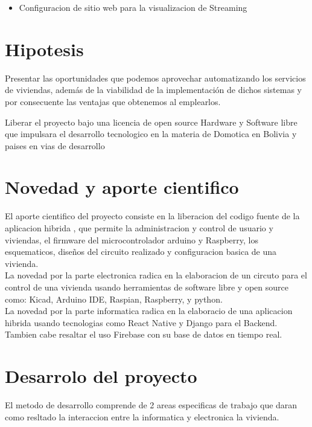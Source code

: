 \documentclass[letterpaper,12pt]{article}
\begin{document}
{\begin{itemize}
	
	\item Configuracion de sitio web para la visualizacion de Streaming 

\end{itemize}




\section{Hipotesis}

Presentar las oportunidades que podemos aprovechar automatizando los servicios de viviendas, además de la viabilidad de la implementación de dichos sistemas y por consecuente las ventajas que obtenemos al emplearlos.

Liberar el proyecto bajo una licencia de open source Hardware y Software libre que impulsara el desarrollo tecnologico en la materia de Domotica en Bolivia y paises en vias de desarrollo

\section{Novedad y aporte cientifico}

El aporte cientifico del proyecto consiste en la liberacion del codigo fuente de la aplicacion hibrida , que permite la administracion y control de usuario y viviendas,  el firmware del microcontrolador  arduino y Raspberry, los esquematicos, diseños del circuito realizado y configuracion basica de una vivienda.\\

La novedad por la parte electronica radica en la elaboracion de un circuto para el control de una vivienda usando herramientas de software libre y open source como: Kicad, Arduino IDE, Raspian, Raspberry, y python.\\

La novedad por la parte informatica radica en la elaboracio de una aplicacion hibrida usando tecnologias como React Native y Django para el Backend. Tambien cabe resaltar el uso  Firebase con su base de datos en tiempo real. \\



\section{Desarrolo del proyecto}
El metodo de desarrollo comprende de 2 areas especificas de trabajo que daran como resltado la interaccion entre la informatica y electronica la vivienda.


}
\end{document}
